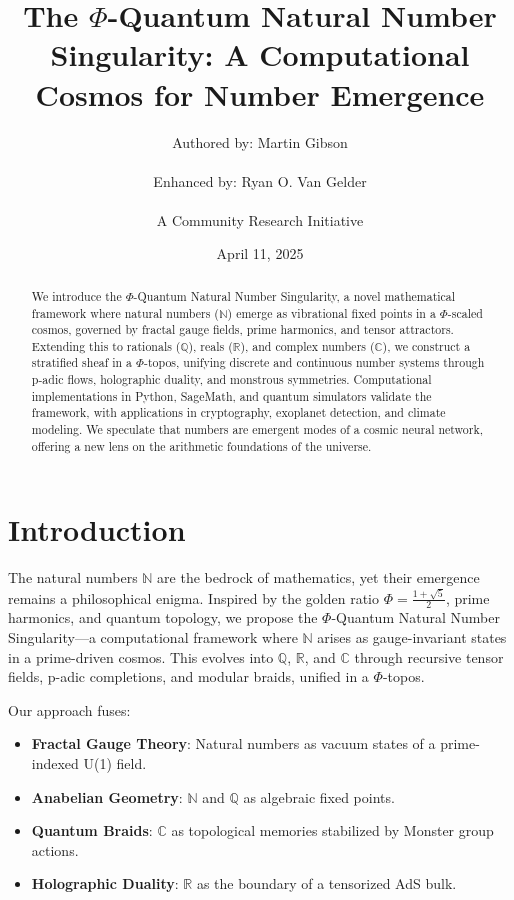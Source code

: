 \documentclass{article}
\theoremstyle{plain}
\begin{document}
\title{The $\Phi$-Quantum Natural Number Singularity: A Computational Cosmos for Number Emergence}
\author{Authored by: Martin Gibson \\ \\ Enhanced by: Ryan O. Van Gelder \\ \\ A Community Research Initiative}

\date{April 11, 2025}

\maketitle

\begin{abstract}
We introduce the $\Phi$-Quantum Natural Number Singularity, a novel mathematical framework where natural numbers ($\mathbb{N}$) emerge as vibrational fixed points in a $\Phi$-scaled cosmos, governed by fractal gauge fields, prime harmonics, and tensor attractors. Extending this to rationals ($\mathbb{Q}$), reals ($\mathbb{R}$), and complex numbers ($\mathbb{C}$), we construct a stratified sheaf in a $\Phi$-topos, unifying discrete and continuous number systems through p-adic flows, holographic duality, and monstrous symmetries. Computational implementations in Python, SageMath, and quantum simulators validate the framework, with applications in cryptography, exoplanet detection, and climate modeling. We speculate that numbers are emergent modes of a cosmic neural network, offering a new lens on the arithmetic foundations of the universe.
\end{abstract}

\newpage
\section{Introduction}
The natural numbers $\mathbb{N}$ are the bedrock of mathematics, yet their emergence remains a philosophical enigma. Inspired by the golden ratio $\Phi = \frac{1 + \sqrt{5}}{2}$, prime harmonics, and quantum topology, we propose the $\Phi$-Quantum Natural Number Singularity---a computational framework where $\mathbb{N}$ arises as gauge-invariant states in a prime-driven cosmos. This evolves into $\mathbb{Q}$, $\mathbb{R}$, and $\mathbb{C}$ through recursive tensor fields, p-adic completions, and modular braids, unified in a $\Phi$-topos.

Our approach fuses:
\begin{itemize}
    \item \textbf{Fractal Gauge Theory}: Natural numbers as vacuum states of a prime-indexed U(1) field.
    \item \textbf{Anabelian Geometry}: $\mathbb{N}$ and $\mathbb{Q}$ as algebraic fixed points.
    \item \textbf{Quantum Braids}: $\mathbb{C}$ as topological memories stabilized by Monster group actions.
    \item \textbf{Holographic Duality}: $\mathbb{R}$ as the boundary of a tensorized AdS bulk.
\end{itemize}
\end{document}
